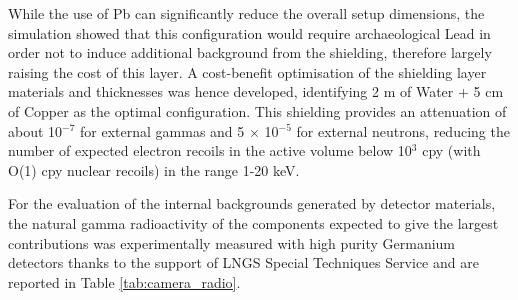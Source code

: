 \documentclass[physics,article,submit,moreauthors,pdftex]{Definitions/mdpi}
\begin{document}
While the use of Pb can significantly reduce the overall setup dimensions, the simulation showed that this configuration would require archaeological Lead in order not to induce additional background from the shielding, therefore largely raising the cost of this layer. A cost-benefit optimisation of the shielding layer materials and thicknesses was hence developed, identifying 2 m of Water + 5 cm of Copper as the optimal configuration. This shielding provides an attenuation of about 10$^{-7}$ for external gammas and 5 $\times$ 10$^{-5}$ for external neutrons, reducing the number of expected electron recoils in the active volume below 10$^3$ cpy (with O(1) cpy nuclear recoils) in the range 1-20 keV. 

\begin{table}[t]
    \centering
    \caption{Measured activity of the internal detector components expected to produce the largest backgrounds in the active volume. The isotopes in parentheses indicate the activity from that particular part of the decay chain. Upper limits are given at 90\% confidence level.}
    \label{tab:camera_radio}
\end{table}

 

For the evaluation of the internal backgrounds generated by detector materials, the natural gamma radioactivity of the components expected to give the largest contributions was experimentally measured with high purity Germanium detectors thanks to the support of LNGS Special Techniques Service and are reported in Table \ref{tab:camera_radio}. 
\end{document}
